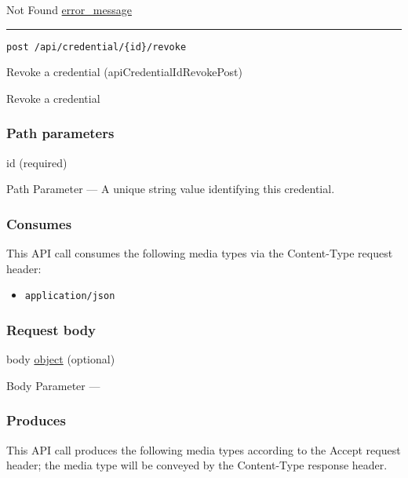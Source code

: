 Not Found \protect\hyperlink{error_message}{error\_message}

\begin{center}\rule{0.5\linewidth}{\linethickness}\end{center}

\protect\hypertarget{apiCredentialIdRevokePost}{}{}

\begin{verbatim}
post /api/credential/{id}/revoke
\end{verbatim}

Revoke a credential ({apiCredentialIdRevokePost})

Revoke a credential

\hypertarget{path-parameters-30}{%
\subsubsection{Path parameters}\label{path-parameters-30}}

id (required)

{Path Parameter} --- A unique string value identifying this credential.

\hypertarget{consumes-18}{%
\subsubsection{Consumes}\label{consumes-18}}

This API call consumes the following media types via the {Content-Type}
request header:

\begin{itemize}
\tightlist
\item
  \texttt{application/json}
\end{itemize}

\hypertarget{request-body-18}{%
\subsubsection{Request body}\label{request-body-18}}

body \protect\hyperlink{object}{object} (optional)

{Body Parameter} ---

\hypertarget{produces-59}{%
\subsubsection{Produces}\label{produces-59}}

This API call produces the following media types according to the
{Accept} request header; the media type will be conveyed by the
{Content-Type} response header.

